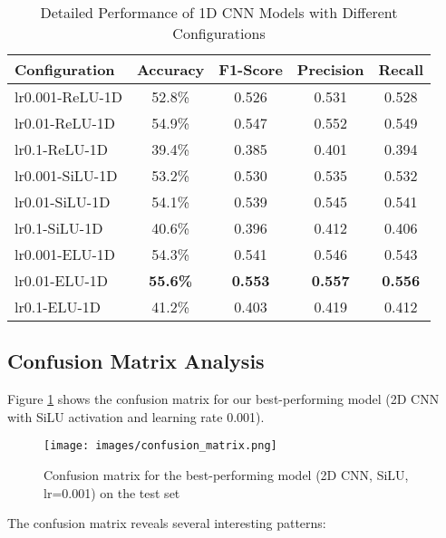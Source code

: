 \begin{table}[h]
\centering
\caption{Detailed Performance of 1D CNN Models with Different Configurations}
\label{tab:1d_results}
\begin{tabular}{@{}lcccc@{}}
\toprule
\textbf{Configuration} & \textbf{Accuracy} & \textbf{F1-Score} & \textbf{Precision} & \textbf{Recall} \\
\midrule
lr0.001-ReLU-1D & 52.8\% & 0.526 & 0.531 & 0.528 \\
lr0.01-ReLU-1D & 54.9\% & 0.547 & 0.552 & 0.549 \\
lr0.1-ReLU-1D & 39.4\% & 0.385 & 0.401 & 0.394 \\
lr0.001-SiLU-1D & 53.2\% & 0.530 & 0.535 & 0.532 \\
lr0.01-SiLU-1D & 54.1\% & 0.539 & 0.545 & 0.541 \\
lr0.1-SiLU-1D & 40.6\% & 0.396 & 0.412 & 0.406 \\
lr0.001-ELU-1D & 54.3\% & 0.541 & 0.546 & 0.543 \\
lr0.01-ELU-1D & \textbf{55.6\%} & \textbf{0.553} & \textbf{0.557} & \textbf{0.556} \\
lr0.1-ELU-1D & 41.2\% & 0.403 & 0.419 & 0.412 \\
\bottomrule
\end{tabular}
\end{table}

\subsection{Confusion Matrix Analysis}

Figure \ref{fig:confusion_matrix} shows the confusion matrix for our best-performing model (2D CNN with SiLU activation and learning rate 0.001).

\begin{figure}[h]
    \centering
    \texttt{[image: images/confusion\_matrix.png]}
    \caption{Confusion matrix for the best-performing model (2D CNN, SiLU, lr=0.001) on the test set}
    \label{fig:confusion_matrix}
\end{figure}

The confusion matrix reveals several interesting patterns:

